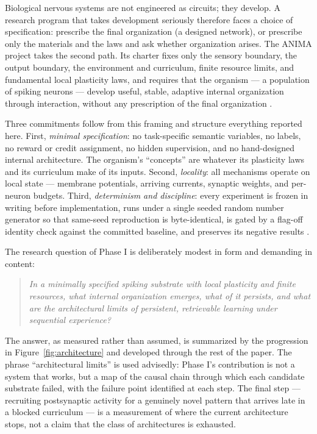 Biological nervous systems are not engineered as circuits; they develop.
A research program that takes development seriously therefore faces a
choice of specification: prescribe the final organization (a designed
network), or prescribe only the materials and the laws and ask whether
organization arises. The ANIMA project takes the second path. Its
charter fixes only the sensory boundary, the output boundary, the
environment and curriculum, finite resource limits, and fundamental
local plasticity laws, and requires that the organism --- a population
of spiking neurons --- develop useful, stable, adaptive internal
organization through interaction, without any prescription of the final
organization \cite{overview,decisionlog}.

Three commitments follow from this framing and structure everything
reported here. First, \emph{minimal specification}: no task-specific
semantic variables, no labels, no reward or credit assignment, no
hidden supervision, and no hand-designed internal architecture. The
organism's ``concepts'' are whatever its plasticity laws and its
curriculum make of its inputs. Second, \emph{locality}: all mechanisms
operate on local state --- membrane potentials, arriving currents,
synaptic weights, and per-neuron budgets. Third, \emph{determinism and
discipline}: every experiment is frozen in writing before
implementation, runs under a single seeded random number generator so
that same-seed reproduction is byte-identical, is gated by a
flag-off identity check against the committed baseline, and preserves
its negative results \cite{overview}.

The research question of Phase I is deliberately modest in form and
demanding in content:

\begin{quote}
\emph{In a minimally specified spiking substrate with local plasticity
and finite resources, what internal organization emerges, what of it
persists, and what are the architectural limits of persistent,
retrievable learning under sequential experience?}
\end{quote}

The answer, as measured rather than assumed, is summarized by the
progression in Figure~\ref{fig:architecture} and developed through the
rest of the paper. The phrase ``architectural limits'' is used
advisedly: Phase I's contribution is not a system that works, but a
map of the causal chain through which each candidate substrate failed,
with the failure point identified at each step. The final step ---
recruiting postsynaptic activity for a genuinely novel pattern that
arrives late in a blocked curriculum --- is a measurement of where the
current architecture stops, not a claim that the class of architectures
is exhausted.

